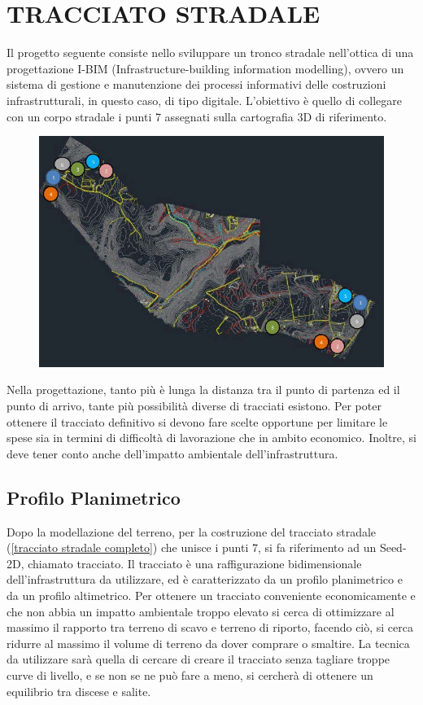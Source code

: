 \chapter{TRACCIATO STRADALE}

Il progetto seguente consiste nello sviluppare un tronco stradale nell’ottica di una progettazione I-BIM (Infrastructure-building information modelling), ovvero un sistema di gestione e manutenzione dei processi informativi delle costruzioni infrastrutturali, in questo caso, di tipo digitale. L’obiettivo è quello di collegare con un corpo stradale i punti 7 assegnati sulla cartografia 3D di riferimento.

\begin{figure}[H]
	\centering
	\includegraphics[width=\linewidth]{Figures/Traccia progetto}
    \label{fig:Traccia progetto}
\end{figure}

Nella progettazione, tanto più è lunga la distanza tra il punto di partenza ed il punto di arrivo, tante più possibilità diverse di tracciati esistono. Per poter ottenere il tracciato definitivo si devono fare scelte opportune per limitare le spese sia in termini di difficoltà di lavorazione che in ambito economico. Inoltre, si deve tener conto anche dell’impatto ambientale dell’infrastruttura.

\section{Profilo Planimetrico}

Dopo la modellazione del terreno, per la costruzione del tracciato stradale (\ref{tracciato stradale completo}) che unisce i punti 7, si fa riferimento ad un Seed-2D, chiamato tracciato. 
Il tracciato è una raffigurazione bidimensionale dell’infrastruttura da utilizzare, ed è caratterizzato da un profilo planimetrico e da un profilo altimetrico. Per ottenere un tracciato conveniente economicamente e che non abbia un impatto ambientale troppo elevato si cerca di ottimizzare al massimo il rapporto tra terreno di scavo e terreno di riporto, facendo ciò, si cerca ridurre al massimo il volume di terreno da dover comprare o smaltire. La tecnica da utilizzare sarà quella di cercare di creare il tracciato senza tagliare troppe curve di livello, e se non se ne può fare a meno, si cercherà di ottenere un equilibrio tra discese e salite.

